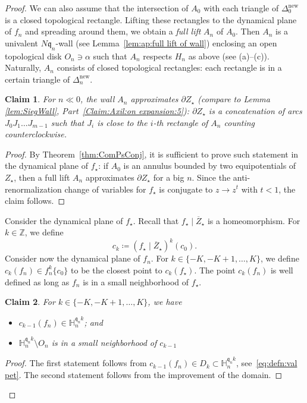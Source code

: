 \documentclass[]{amsart}
\newcommand{\bDelta}{{\mathbb{\Delta}}}
\newcommand{\fH}{{\mathbb H}}
\newcommand{\str}{{\star}}
\renewcommand{\qq}{\mathfrak{q}}
\newcommand\new{{\operatorname{new}}}
\newtheorem{claim3}{Claim}
\newcommand{\Z}{\mathbb{Z}}
\theoremstyle{remark}
\numberwithin{equation}{section}
\theoremstyle{definition}
\begin{document}
\begin{proof}
We can also assume that the intersection of $A_0$ with each triangle of $\bDelta_0^\new$ is a closed topological rectangle. Lifting these rectangles to the dynamical plane of $f_n$ and spreading around them, we obtain a \emph{full lift} $A_n$ of $A_0$. Then $A_n$ is a univalent $N\qq_n$-wall (see Lemma~\ref{lem:ap:full lift of wall}) enclosing an open topological disk $O_n\ni \alpha$ such that $A_n$ respects $H_n$ as above (see (a)--(c)). Naturally, $A_n$ consists of closed topological rectangles: each rectangle is in a certain triangle of $\bDelta^\new_n$.

\begin{claim3}
\label{cl3:WallAppr partial Z}
For $n\ll0$, the wall $A_n$ approximates $\partial Z_\str$ (compare to Lemma \ref{lem:SiegWall}, Part~\eqref{Claim:Axil:on expansion:5}): $\partial Z_\str$ is a concatenation of arcs $J_0J_1\dots J_{m-1}$ such that $J_i$ is close to the $i$-th rectangle of $A_n$ counting counterclockwise.
\end{claim3}
\begin{proof}
By Theorem~\ref{thm:ComPsConj}, it is sufficient to prove such statement in the dynamical plane of $f_\str$: if $A_0$ is an annulus bounded by two equipotentials of $Z_\str$, then a full lift $A_n$ approximates $\partial Z_\str$ for a big $n$. Since the anti-renormalization change of variables for $f_\str$ is conjugate to $z\to z^{t}$ with $t<1$, the claim follows.
\end{proof}

Consider the dynamical plane of $f_\str$. Recall that $f_\str\mid \overline Z_\str$ is a homeomorphism. For $k\in \Z$, we define \[c_k\coloneqq \left(f_\str\mid \overline Z_\str\right)^k(c_0).\] Consider now the dynamical plane of $f_n$. For $k\in \{-K,-K+1,\dots, K\}$, we define $c_k(f_n)\in f_n^{k}\{ c_0\}$ to be the closest point to $c_k(f_\str)$. The point $c_k(f_n)$ is well defined as long as $f_n$ is in a small neighborhood of $f_\str$.

\begin{claim3}
\label{cl3:fH are small} For $k\in \{-K,-K+1,\dots, K\}$, we have
\begin{itemize}
\item $c_{k-1}(f_n)\in \fH_n^{\qq_n k}$; and
\item $ \fH_n^{\qq_n k}\setminus O_n$ is in a small neighborhood of $c_{k-1}$ 
\end{itemize}
\end{claim3}
\begin{proof}
The first statement follows from $c_{k-1}(f_n)\in D_k\subset  \fH_n^{\qq_n k}$, see~\eqref{eq:defn:val pet}. The second statement follows from the improvement of the domain.
\end{proof}



\end{proof}
\end{document}
